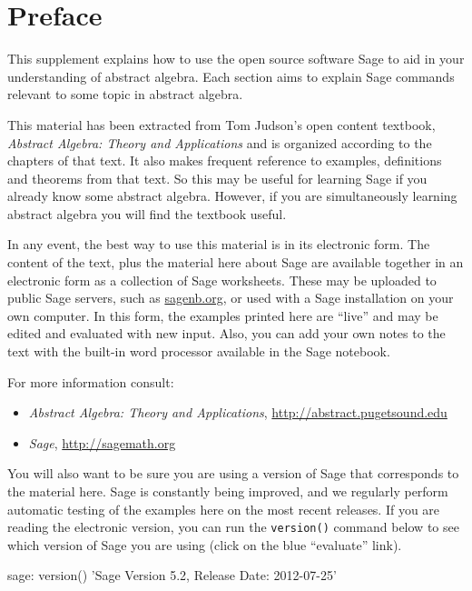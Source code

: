 \documentclass[12pt,oneside]{book}
\begin{document}
\chapter*{Preface}
This supplement explains how to use the open source software Sage to aid in your understanding of abstract algebra.  Each section aims to explain Sage commands relevant to some topic in abstract algebra.\par
%
This material has been extracted from Tom Judson's open content textbook, {\sl Abstract Algebra: Theory and Applications} and is organized according to the chapters of that text.  It also makes frequent reference to examples, definitions and theorems from that text.  So this may be useful for learning Sage if you already know some abstract algebra.  However, if you are simultaneously learning abstract algebra you will find the textbook useful.\par
%
In any event, the best way to use this material is in its electronic form.  The content of the text, plus the material here about Sage are available together in an electronic form as a collection of Sage worksheets.  These may be uploaded to public Sage servers, such as \url{sagenb.org}, or used with a Sage installation on your own computer.  In this form, the examples printed here are ``live'' and may be edited and evaluated with new input.  Also, you can add your own notes to the text with the built-in word processor available in the Sage notebook.\par
%
For more information consult:
%
\begin{itemize}
%
\item {\sl Abstract Algebra: Theory and Applications}, \url{http://abstract.pugetsound.edu}
%
\item {\sl Sage}, \url{http://sagemath.org}
%
\end{itemize}
%
You will also want to be sure you are using a version of Sage that corresponds to the material here.  Sage is constantly being improved, and we regularly perform automatic testing of the examples here on the most recent releases.  If you are reading the electronic version, you can run the \verb?version()? command below to see which version of Sage you are using (click on the blue ``evaluate'' link).
%
\begin{sageverbatim}
sage: version()
'Sage Version 5.2, Release Date: 2012-07-25'
\end{sageverbatim}
%
\begin{sageverbatim}
\end{sageverbatim}
\end{document}
